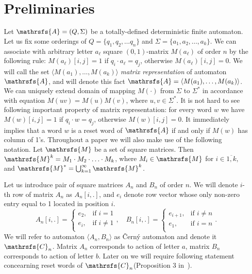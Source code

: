 \documentclass[11pt]{llncs}
\newcommand{\A}{\mathrsfs{A}}
\newcommand{\C}{\mathrsfs{C}}
\begin{document}
\section{Preliminaries}
Let $\A = (Q, \Sigma)$ be a totally-defined deterministic finite automaton. Let us fix some orderings 
of $Q = \{q_1, q_2, \ldots q_n\}$ and $\Sigma = \{a_1, a_2, \ldots, a_k\}$.
We can associate with arbitrary letter $a_\ell$
square $(0,1)$-matrix $M(a_\ell)$ of order $n$ by the following rule:
$M(a_\ell)[i,j] = 1$ if $q_i\cdot a_{\ell} = q_j$, otherwise $M(a_\ell)[i,j] = 0$.
We will call the set $\langle M(a_1), \ldots, M(a_{k})\rangle$  \emph{matrix representation} of automaton $\A$,
and will denote this fact $\A = \langle M(a_1), \ldots, M(a_{k})\rangle$. We can uniquely extend domain of mapping $M(\cdot )$ 
from $\Sigma$ to $\Sigma^{*}$ in accordance with equation $M(uv) = M(u)M(v)$, where $u,v \in \Sigma^*$.
It is not hard to see following important property of matrix representation: for every word $w$ we have
$M(w)[i,j] = 1$ if $q_i \cdot w = q_j$, otherwise $M(w)[i,j] = 0$. It immediately implies that
a word $w$ is a reset word of $\A$ if and only if $M(w)$ has column of 1's.
Throughout a paper we will also make use of the following notation. Let $\mathrsfs{M}$ be a set of square matrices.
Then $\mathrsfs{M}^{k} = M_1 \cdot M_2 \cdot \ldots \cdot M_k$, where $M_i \in \mathrsfs{M}$ for $i \in \overline{1,k}$,
and $\mathrsfs{M}^* = \bigcup_{k = 1}^{\infty} \mathrsfs{M}^k$.

Let us introduce pair of square matrices $A_n$ and $B_n$ of order $n$. We will denote $i$-th row of matrix
$A_n$ as $A_n[i,.]$, and $e_i$ denote row vector whose only non-zero entry equal to 1 located in position $i$.
$$ A_n[i,.] = 
\begin{cases}
e_2, &\text{if } i = 1\\
e_i, &\text{if } i \neq 1\\
\end{cases},\quad
B_n[i,.] = 
\begin{cases}
e_{i+1}, &\text{if } i \neq n\\
e_1, &\text{if } i = n\\
\end{cases}.
$$
We will refer to automaton $\langle A_n, B_n \rangle$ as \v{C}ern\'{y} automaton and denote it $\C_n$.
Matrix $A_n$ corresponds to action of letter $a$, matrix $B_n$ corresponds to action of letter $b$.
Later on we will require following statement concearning reset words of $\C_n$(Proposition 3 in~\cite{Gu}).
\end{document}
